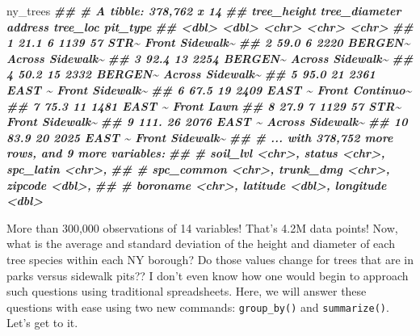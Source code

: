 \documentclass[
]{krantz}
\newenvironment{Shaded}{\begin{snugshade}}{\end{snugshade}}
\newcommand{\DocumentationTok}[1]{\textcolor[rgb]{0.56,0.35,0.01}{\textbf{\textit{#1}}}}
\newcommand{\NormalTok}[1]{#1}
\begin{document}
\begin{Shaded}
\begin{Highlighting}[]
\NormalTok{ny\_trees}
\DocumentationTok{\#\# \# A tibble: 378,762 x 14}
\DocumentationTok{\#\#    tree\_height tree\_diameter address      tree\_loc pit\_type }
\DocumentationTok{\#\#          \textless{}dbl\textgreater{}         \textless{}dbl\textgreater{} \textless{}chr\textgreater{}        \textless{}chr\textgreater{}    \textless{}chr\textgreater{}    }
\DocumentationTok{\#\#  1        21.1             6 1139 57 STR\textasciitilde{} Front    Sidewalk\textasciitilde{}}
\DocumentationTok{\#\#  2        59.0             6 2220 BERGEN\textasciitilde{} Across   Sidewalk\textasciitilde{}}
\DocumentationTok{\#\#  3        92.4            13 2254 BERGEN\textasciitilde{} Across   Sidewalk\textasciitilde{}}
\DocumentationTok{\#\#  4        50.2            15 2332 BERGEN\textasciitilde{} Across   Sidewalk\textasciitilde{}}
\DocumentationTok{\#\#  5        95.0            21 2361 EAST  \textasciitilde{} Front    Sidewalk\textasciitilde{}}
\DocumentationTok{\#\#  6        67.5            19 2409 EAST  \textasciitilde{} Front    Continuo\textasciitilde{}}
\DocumentationTok{\#\#  7        75.3            11 1481 EAST  \textasciitilde{} Front    Lawn     }
\DocumentationTok{\#\#  8        27.9             7 1129 57 STR\textasciitilde{} Front    Sidewalk\textasciitilde{}}
\DocumentationTok{\#\#  9       111.             26 2076 EAST  \textasciitilde{} Across   Sidewalk\textasciitilde{}}
\DocumentationTok{\#\# 10        83.9            20 2025 EAST  \textasciitilde{} Front    Sidewalk\textasciitilde{}}
\DocumentationTok{\#\# \# ... with 378,752 more rows, and 9 more variables:}
\DocumentationTok{\#\# \#   soil\_lvl \textless{}chr\textgreater{}, status \textless{}chr\textgreater{}, spc\_latin \textless{}chr\textgreater{},}
\DocumentationTok{\#\# \#   spc\_common \textless{}chr\textgreater{}, trunk\_dmg \textless{}chr\textgreater{}, zipcode \textless{}dbl\textgreater{},}
\DocumentationTok{\#\# \#   boroname \textless{}chr\textgreater{}, latitude \textless{}dbl\textgreater{}, longitude \textless{}dbl\textgreater{}}
\end{Highlighting}
\end{Shaded}

More than 300,000 observations of 14 variables! That's 4.2M data points! Now, what is the average and standard deviation of the height and diameter of each tree species within each NY borough? Do those values change for trees that are in parks versus sidewalk pits?? I don't even know how one would begin to approach such questions using traditional spreadsheets. Here, we will answer these questions with ease using two new commands: \texttt{group\_by()} and \texttt{summarize()}. Let's get to it.
\end{document}
